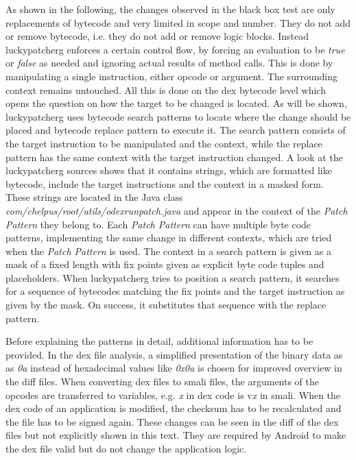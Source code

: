 As shown in the following, the changes observed in the black box test are only replacements of bytecode and very limited in scope and number.
They do not add or remove bytecode, i.e. they do not add or remove logic blocks.
Instead \gls{luckypatcherg} enforces a certain control flow, by forcing an evaluation to be \textit{true} or \textit{false} as needed and ignoring actual results of method calls.
This is done by manipulating a single instruction, either opcode or argument.
The surrounding context remains untouched.
\newline
All this is done on the dex bytecode level which opens the question on how the target to be changed is located.
As will be shown, \gls{luckypatcherg} uses bytecode search patterns to locate where the change should be placed and bytecode replace pattern to execute it.
\newline
The search pattern consists of the target instruction to be manipulated and the context, while the replace pattern has the same context with the target instruction changed.
A look at the \gls{luckypatcherg} sources shows that it contains strings, which are formatted like bytecode, include the target instructions and the context in a masked form.
These strings are located in the Java class \textit{com/chelpus/root/utils/odexrunpatch.java} and appear in the context of the \textit{Patch Pattern} they belong to.
Each \textit{Patch Pattern} can have multiple byte code patterns, implementing the same change in different contexts, which are tried when the \textit{Patch Pattern} is used.
\newline
The context in a search pattern is given as a mask of a fixed length with fix points given as explicit byte code tuples and placeholders.
When \gls{luckypatcherg} tries to position a search pattern, it searches for a sequence of bytecodes matching the fix points and the target instruction as given by the mask.
On success, it substitutes that sequence with the replace pattern.
\newline
\newline

Before explaining the patterns in detail, additional information has to be provided.
In the \gls{dex} file analysis, a simplified presentation of the binary data as as \textit{0a} instead of hexadecimal values like \textit{0x0a} is chosen for improved overview in the diff files.
When converting \gls{dex} files to smali files, the arguments of the opcodes are transferred to variables, e.g. \textit{x} in dex code is v\textit{x} in smali.
\newline
\newline
When the dex code of an application is modified, the checksum has to be recalculated and the file has to be signed again.
These changes can be seen in the diff of the dex files but not explicitly shown in this text.
They are required by Android to make the \gls{dex} file valid but do not change the application logic.

